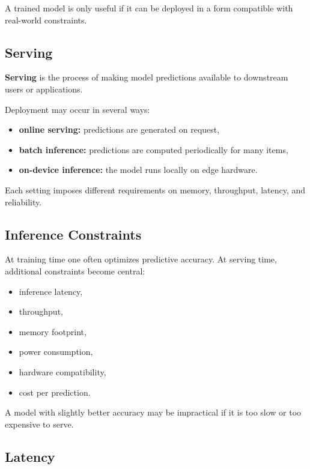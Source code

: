 A trained model is only useful if it can be deployed in a form compatible with real-world constraints.

\subsection{Serving}

\textbf{Serving} is the process of making model predictions available to downstream users or applications.

\medskip

\noindent
Deployment may occur in several ways:
\begin{itemize}
    \item \textbf{online serving:} predictions are generated on request,
    \item \textbf{batch inference:} predictions are computed periodically for many items,
    \item \textbf{on-device inference:} the model runs locally on edge hardware.
\end{itemize}

\medskip

\noindent
Each setting imposes different requirements on memory, throughput, latency, and reliability.

\subsection{Inference Constraints}

At training time one often optimizes predictive accuracy. At serving time, additional constraints become central:
\begin{itemize}
    \item inference latency,
    \item throughput,
    \item memory footprint,
    \item power consumption,
    \item hardware compatibility,
    \item cost per prediction.
\end{itemize}

\medskip

\noindent
A model with slightly better accuracy may be impractical if it is too slow or too expensive to serve.

\subsection{Latency}

